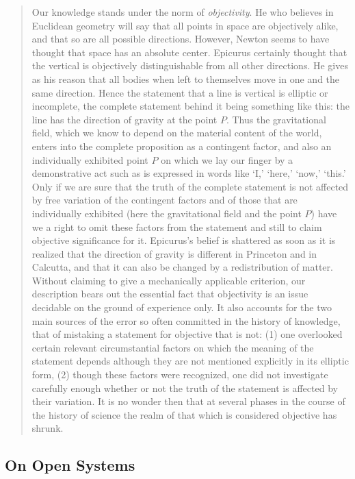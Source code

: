 \begin{quote}
    Our knowledge stands under the norm of \emph{objectivity}.  He who believes in Euclidean geometry will say that all points in space are objectively alike, and that so are all possible directions.  However, Newton seems to have thought that space has an absolute center.  Epicurus certainly thought that the vertical is objectively distinguishable from all other directions.  He gives as his reason that all bodies when left to themselves move in one and the same direction.  Hence the statement that a line is vertical is elliptic or incomplete, the complete statement behind it being something like this: the line has the direction of gravity at the point $P$.  Thus the gravitational field, which we know to depend on the material content of the world, enters into the complete proposition as a contingent factor, and also an individually exhibited point $P$ on which we lay our finger by a demonstrative act such as is expressed in words like `I,' `here,' `now,' `this.'  Only if we are sure that the truth of the complete statement is not affected by free variation of the contingent factors and of those that are individually exhibited (here the gravitational field and the point $P$) have we a right to omit these factors from the statement and still to claim objective significance for it.  Epicurus's belief is shattered as soon as it is realized that the direction of gravity is different in Princeton and in Calcutta, and that it can also be changed by a redistribution of matter.  Without claiming to give a mechanically applicable criterion, our description bears out the essential fact that objectivity is an issue decidable on the ground of experience only.  It also accounts for the two main sources of the error so often committed in the history of knowledge, that of mistaking a statement for objective that is not: (1) one overlooked certain relevant circumstantial factors on which the meaning of the statement depends although they are not mentioned explicitly in its elliptic form, (2) though these factors were recognized, one did not investigate carefully enough whether or not the truth of the statement is affected by their variation.  It is no wonder then that at several phases in the course of the history of science the realm of that which is considered objective has shrunk.  \citep[p. 71-72]{Weyl1949}
\end{quote}





\subsection{On Open Systems}

